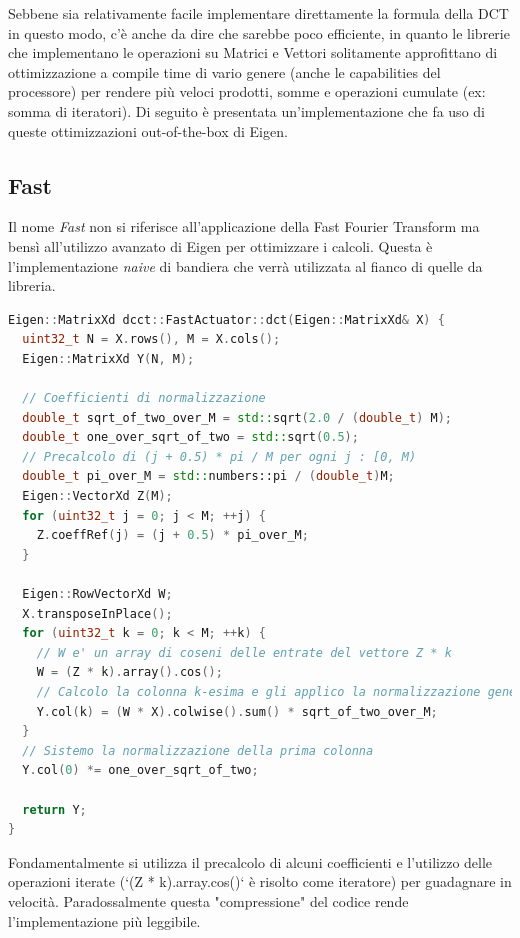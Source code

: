 \documentclass[a4paper,11pt,oneside, table]{article}
\begin{document}
Sebbene sia relativamente facile implementare direttamente la formula della DCT in questo modo, c'\`e anche da dire che sarebbe poco efficiente, in quanto le librerie che implementano le operazioni su Matrici e Vettori solitamente approfittano di ottimizzazione a compile time di vario genere (anche le capabilities del processore) per rendere pi\`u veloci prodotti, somme e operazioni cumulate (ex: somma di iteratori).
Di seguito \`e presentata un'implementazione che fa uso di queste ottimizzazioni out-of-the-box di Eigen.

\subsection{Fast}

Il nome \textit{Fast} non si riferisce all'applicazione della Fast Fourier Transform ma bens\`i all'utilizzo avanzato di Eigen per ottimizzare i calcoli.
Questa \`e l'implementazione \textit{naive} di bandiera che verr\`a utilizzata al fianco di quelle da libreria.

\begin{lstlisting}[language=C++]
Eigen::MatrixXd dcct::FastActuator::dct(Eigen::MatrixXd& X) {
  uint32_t N = X.rows(), M = X.cols();
  Eigen::MatrixXd Y(N, M);

  // Coefficienti di normalizzazione
  double_t sqrt_of_two_over_M = std::sqrt(2.0 / (double_t) M);
  double_t one_over_sqrt_of_two = std::sqrt(0.5);
  // Precalcolo di (j + 0.5) * pi / M per ogni j : [0, M)
  double_t pi_over_M = std::numbers::pi / (double_t)M;
  Eigen::VectorXd Z(M);
  for (uint32_t j = 0; j < M; ++j) {
    Z.coeffRef(j) = (j + 0.5) * pi_over_M;
  }

  Eigen::RowVectorXd W;
  X.transposeInPlace();
  for (uint32_t k = 0; k < M; ++k) {
    // W e' un array di coseni delle entrate del vettore Z * k
    W = (Z * k).array().cos();
    // Calcolo la colonna k-esima e gli applico la normalizzazione generica
    Y.col(k) = (W * X).colwise().sum() * sqrt_of_two_over_M;
  }
  // Sistemo la normalizzazione della prima colonna
  Y.col(0) *= one_over_sqrt_of_two;

  return Y;
}
\end{lstlisting}

Fondamentalmente si utilizza il precalcolo di alcuni coefficienti e l'utilizzo delle operazioni iterate (`(Z * k).array.cos()` \`e risolto come iteratore) per guadagnare in velocit\`a.
Paradossalmente questa "compressione" del codice rende l'implementazione pi\`u leggibile.
\end{document}
